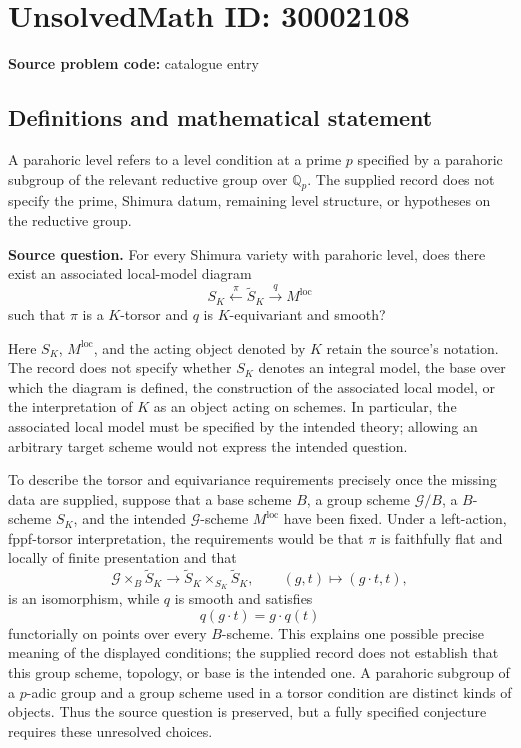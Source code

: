 \documentclass[11pt]{article}
\newcommand{\Q}{\mathbb{Q}}
\begin{document}
\section*{UnsolvedMath ID: 30002108}
\textbf{Source problem code:} catalogue entry
\subsection{Definitions and mathematical statement}
A parahoric level refers to a level condition at a prime \(p\) specified by a parahoric subgroup of the relevant reductive group over \(\Q_p\). The supplied record does not specify the prime, Shimura datum, remaining level structure, or hypotheses on the reductive group.

\textbf{Source question.} For every Shimura variety with parahoric level, does there exist an associated local-model diagram
\[
S_K \xleftarrow{\ \pi\ } \widetilde S_K
\xrightarrow{\ q\ } M^{\mathrm{loc}}
\]
such that \(\pi\) is a \(K\)-torsor and \(q\) is \(K\)-equivariant and smooth?

Here \(S_K\), \(M^{\mathrm{loc}}\), and the acting object denoted by \(K\) retain the source's notation. The record does not specify whether \(S_K\) denotes an integral model, the base over which the diagram is defined, the construction of the associated local model, or the interpretation of \(K\) as an object acting on schemes. In particular, the associated local model must be specified by the intended theory; allowing an arbitrary target scheme would not express the intended question.

To describe the torsor and equivariance requirements precisely once the missing data are supplied, suppose that a base scheme \(B\), a group scheme \(\mathcal G/B\), a \(B\)-scheme \(S_K\), and the intended \(\mathcal G\)-scheme \(M^{\mathrm{loc}}\) have been fixed. Under a left-action, fppf-torsor interpretation, the requirements would be that \(\pi\) is faithfully flat and locally of finite presentation and that
\[
\mathcal G\times_B\widetilde S_K
\longrightarrow
\widetilde S_K\times_{S_K}\widetilde S_K,
\qquad (g,t)\longmapsto(g\cdot t,t),
\]
is an isomorphism, while \(q\) is smooth and satisfies
\[
q(g\cdot t)=g\cdot q(t)
\]
functorially on points over every \(B\)-scheme. This explains one possible precise meaning of the displayed conditions; the supplied record does not establish that this group scheme, topology, or base is the intended one. A parahoric subgroup of a \(p\)-adic group and a group scheme used in a torsor condition are distinct kinds of objects. Thus the source question is preserved, but a fully specified conjecture requires these unresolved choices.
\end{document}
